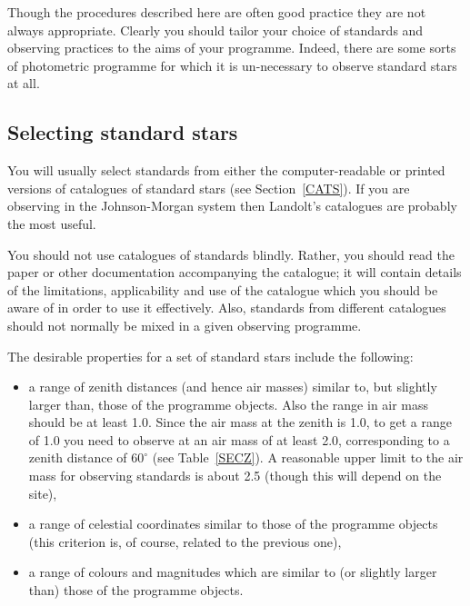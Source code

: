 \documentclass[twoside,11pt,nolof]{starlink}
\begin{document}
Though the procedures described here are often good practice they are
not always appropriate.  Clearly you should tailor your choice of
standards and observing practices to the aims of your programme.
Indeed, there are some sorts of photometric programme for which it is
un-necessary to observe standard stars at all.

\subsection{\label{SEL_STANDARD}Selecting standard stars}

You will usually select standards from either the computer-readable or
printed versions of catalogues of standard stars (see
Section~\ref{CATS}).  If you are observing in the Johnson-Morgan system
then Landolt's catalogues are probably the most useful.

You should not use catalogues of standards blindly.  Rather, you should
read the paper or other documentation accompanying the catalogue; it
will contain details of the limitations, applicability and use of the
catalogue which you should be aware of in order to use it effectively.
Also, standards from different catalogues should not normally be mixed
in a given observing programme.

The desirable properties for a set of standard stars include the
following:

\begin{itemize}

  \item a range of zenith distances (and hence air masses) similar to,
   but slightly larger than, those of the programme objects.  Also
   the range in air mass should be at least 1.0.  Since the
   air mass at the zenith is 1.0, to get a range of 1.0 you need to
   observe at an air mass of at least 2.0, corresponding to a zenith
   distance of $60^{\circ}$ (see Table~\ref{SECZ}).  A reasonable upper
   limit to the air mass for observing standards is about 2.5 (though
   this will depend on the site),

  \item a range of celestial coordinates similar to those of the
   programme objects (this criterion is, of course, related to the
   previous one),

  \item a range of colours and magnitudes which are similar to (or
   slightly larger than) those of the programme objects.

\end{itemize}
\end{document}
